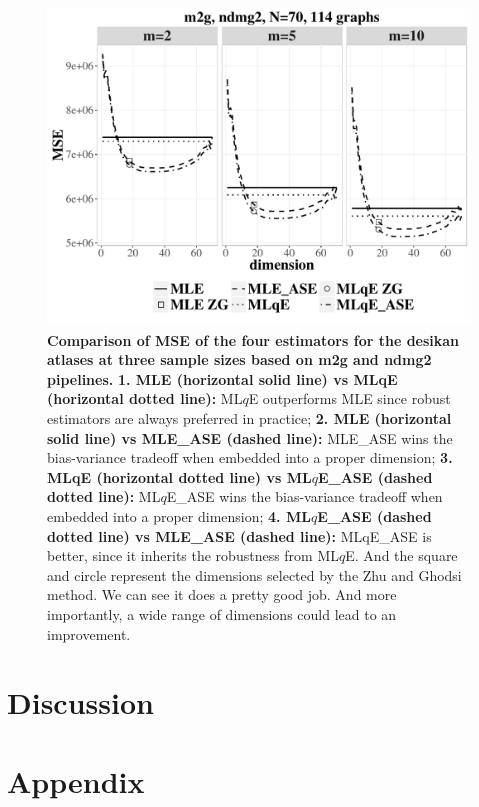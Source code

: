 \documentclass[a4paper]{article}
\begin{document}
\begin{figure}
\centering
\includegraphics[width=\textwidth]{CCI.pdf}
\caption{{\bf Comparison of MSE of the four estimators for the desikan atlases at three sample sizes based on m2g and ndmg2 pipelines.}  
{\bf 1. MLE (horizontal solid line) vs MLqE (horizontal dotted line):} 
ML$q$E outperforms MLE since robust estimators are always preferred in practice;
{\bf 2. MLE (horizontal solid line) vs MLE\_ASE (dashed line):} MLE\_ASE wins the bias-variance tradeoff when embedded into a proper dimension; 
{\bf 3. MLqE (horizontal dotted line) vs ML$q$E\_ASE (dashed dotted line):}
ML$q$E\_ASE wins the bias-variance tradeoff when embedded into a proper dimension; 
{\bf 4.  ML$q$E\_ASE (dashed dotted line) vs MLE\_ASE (dashed
line):}
MLqE\_ASE is better, since it inherits the robustness from 
ML$q$E. And the square and circle represent the dimensions selected by the Zhu and Ghodsi method. We can see it does a pretty good job. And more importantly, a wide range of dimensions could lead to an improvement.
}
\label{fig:CCI}
\end{figure}






\section{Discussion}


\section{Appendix}
\end{document}
